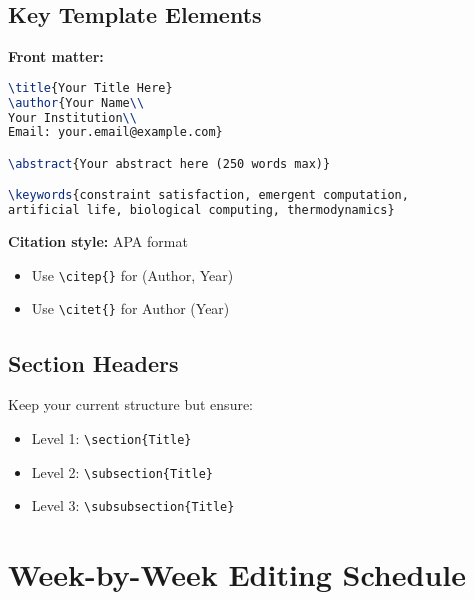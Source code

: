 \documentclass[11pt]{article}
\begin{document}
\subsection{Key Template Elements}

\textbf{Front matter:}
\begin{lstlisting}[language=TeX]
\title{Your Title Here}
\author{Your Name\\
Your Institution\\
Email: your.email@example.com}

\abstract{Your abstract here (250 words max)}

\keywords{constraint satisfaction, emergent computation, 
artificial life, biological computing, thermodynamics}
\end{lstlisting}

\textbf{Citation style:} APA format
\begin{itemize}
    \item Use \verb|\citep{}| for (Author, Year)
    \item Use \verb|\citet{}| for Author (Year)
\end{itemize}

\subsection{Section Headers}

Keep your current structure but ensure:
\begin{itemize}
    \item Level 1: \verb|\section{Title}|
    \item Level 2: \verb|\subsection{Title}|
    \item Level 3: \verb|\subsubsection{Title}|
\end{itemize}

\section{Week-by-Week Editing Schedule}
\end{document}
